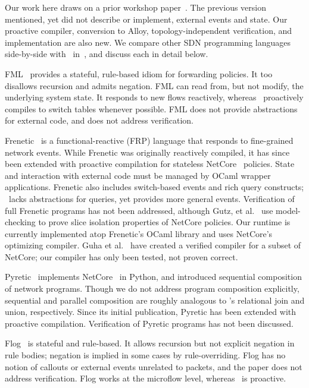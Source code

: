 Our work here draws on a prior workshop
paper~\cite{ngdfk:hotsdn13-flowlog}. The previous version mentioned,
yet did not describe or implement, external events and state. Our
proactive compiler, conversion to Alloy, topology-independent
verification, and implementation are also new. We compare other SDN
programming languages side-by-side with \flowlog\
in~, and discuss each in detail below.

FML~\cite{hinrichs:wren09-fml} provides a
stateful, rule-based idiom for forwarding policies.  It too
disallows recursion and admits negation. FML can read from, but not
modify, the underlying system state. It responds to new flows reactively,
whereas \flowlog\ proactively compiles to switch tables whenever possible. FML
does not provide abstractions for external code, and does not
address verification.

Frenetic~\cite{foster:icfp11-frenetic} is a functional-reactive (FRP) language that 
responds to fine-grained network events. While Frenetic was originally 
reactively compiled, it has since been extended with proactive compilation for stateless
NetCore~\cite{monsanto:popl12-netcore} policies. State and interaction with
external code must be managed by OCaml wrapper applications.
Frenetic also includes switch-based events and rich query constructs;
\flowlog\ lacks abstractions for queries, yet provides more general events.
Verification of full Frenetic
programs has not been addressed, although Gutz, et al.~\cite{gutz:hotsdn12-slices} use model-checking to 
prove slice isolation properties of NetCore policies.
Our runtime is currently implemented atop Frenetic's OCaml library and uses NetCore's optimizing compiler.
Guha et al.~\cite{guha:sdnverif} have created a verified compiler for a subset of NetCore; our compiler has
only been tested, not proven correct.

Pyretic~\cite{monsanto++:nsdi13-pyretic} implements NetCore~\cite{monsanto:popl12-netcore} in Python,
and introduced sequential composition of network programs.
Though we do not address program
composition explicitly, sequential and parallel composition are roughly
analogous to \flowlog's relational join and union, respectively.
Since its initial publication, Pyretic has been extended with proactive compilation.
Verification of Pyretic programs has not been discussed.

Flog~\cite{katta:xldi12-flog} is stateful and rule-based. It allows recursion
but not explicit negation in rule bodies; negation is implied in some cases by
rule-overriding. Flog has no notion of callouts or external events unrelated
to packets, and the paper does not address verification. Flog works at the
microflow level, whereas \flowlog\ is proactive.

